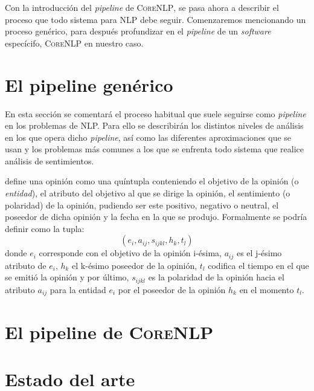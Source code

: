 Con la introducción del \emph{pipeline} de \textsc{CoreNLP}, se pasa ahora a
describir el proceso que todo sistema para \ac{NLP} debe seguir. Comenzaremos
mencionando un proceso genérico, para después profundizar en el \emph{pipeline}
de un \emph{software} especícifo, \textsc{CoreNLP} en nuestro caso.

\section{El pipeline genérico}
\label{sec:genericpipeline}

En esta sección se comentará el proceso habitual que suele seguirse como
\emph{pipeline} en los problemas de \ac{NLP}. Para ello se describirán los
distintos niveles de análisis en los que opera dicho \emph{pipeline}, así como
las diferentes aproximaciones que se usan y los problemas más comunes a los que
se enfrenta todo sistema que realice  análisis de
sentimientos.

\citet{liu:2010} define una opinión como una quíntupla conteniendo el objetivo
de la opinión (o \emph{entidad}), el atributo del objetivo al que se dirige la
opinión, el sentimiento (o polaridad) de la opinión, pudiendo ser este positivo,
negativo o neutral, el poseedor de dicha opinión y la fecha en la que se
produjo. Formalmente se podría definir como la tupla:
\[
  (e_i, a_{ij}, s_{ijkl}, h_k, t_l)
\]
donde $e_i$ corresponde con el objetivo de la opinión i-ésima, $a_{ij}$ es el
j-ésimo atributo de $e_i$, $h_k$ el k-ésimo poseedor de la opinión, $t_l$
codifica el tiempo en el que se emitió la opinión y por último, $s_{ijkl}$ es la
polaridad de la opinión hacia el atributo $a_{ij}$ para la entidad $e_i$ por el
poseedor de la opinión $h_k$ en el momento $t_l$.

\section{El pipeline de \textsc{CoreNLP}}
\label{sec:corenlppipeline}

\section{Estado del arte}
\label{sec:stateoftheart}



